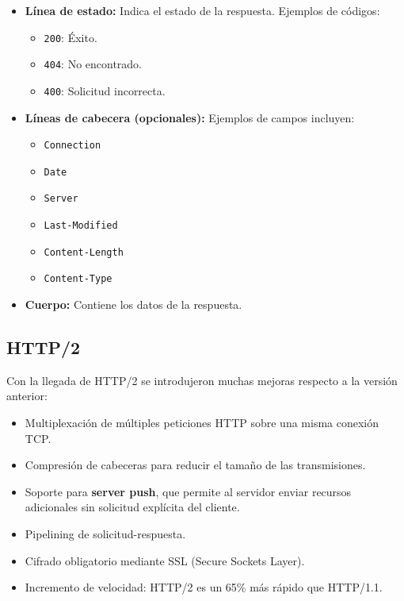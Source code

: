 \documentclass{article}
\begin{document}
\begin{itemize}
    \item \textbf{Línea de estado:} Indica el estado de la respuesta. Ejemplos de códigos:
    \begin{itemize}
        \item \texttt{200}: Éxito.
        \item \texttt{404}: No encontrado.
        \item \texttt{400}: Solicitud incorrecta.
    \end{itemize}

    \item \textbf{Líneas de cabecera (opcionales):} Ejemplos de campos incluyen:
    \begin{itemize}
        \item \texttt{Connection}
        \item \texttt{Date}
        \item \texttt{Server}
        \item \texttt{Last-Modified}
        \item \texttt{Content-Length}
        \item \texttt{Content-Type}
    \end{itemize}

    \item \textbf{Cuerpo:} Contiene los datos de la respuesta.
\end{itemize}

\subsection{HTTP/2}

Con la llegada de HTTP/2 se introdujeron muchas mejoras respecto a la versión anterior:

\begin{itemize}
    \item Multiplexación de múltiples peticiones HTTP sobre una misma conexión TCP.
    \item Compresión de cabeceras para reducir el tamaño de las transmisiones.
    \item Soporte para \textbf{server push}, que permite al servidor enviar recursos adicionales sin solicitud explícita del cliente.
    \item Pipelining de solicitud-respuesta.
    \item Cifrado obligatorio mediante SSL (Secure Sockets Layer).
    \item Incremento de velocidad: HTTP/2 es un 65\% más rápido que HTTP/1.1.
\end{itemize}
\end{document}
